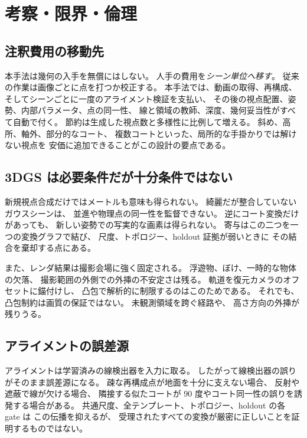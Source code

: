 \section{考察・限界・倫理}
\label{sec:discussion}

\subsection{注釈費用の移動先}
\label{sec:amortization}

本手法は幾何の入手を無償にはしない。
人手の費用を\emph{シーン単位へ移す}。
従来の作業は画像ごとに点を打つか校正する。
本手法では、動画の取得、再構成、
そしてシーンごとに一度のアライメント検証を支払い、
その後の視点配置、姿勢、内部パラメータ、点の同一性、
線と領域の教師、深度、幾何妥当性がすべて自動で付く。
節約は生成した視点数と多様性に比例して増える。
斜め、高所、軸外、部分的なコート、
複数コートといった、局所的な手掛かりでは解けない視点を
安価に追加できることがこの設計の要点である。

\subsection{3DGS は必要条件だが十分条件ではない}
\label{sec:gs_limit}

新規視点合成だけではメートルも意味も得られない。
綺麗だが整合していないガウスシーンは、
並進や物理点の同一性を監督できない。
逆にコート変換だけがあっても、
新しい姿勢での写実的な画素は得られない。
寄与はこの二つを一つの変換グラフで結び、
尺度、トポロジー、holdout 証拠が弱いときに
その結合を棄却する点にある。

また、レンダ結果は撮影会場に強く固定される。
浮遊物、ぼけ、一時的な物体の欠落、
撮影範囲の外側での外挿の不安定さは残る。
軌道を復元カメラのオフセットに錨付けし、
凸包で解析的に制限するのはこのためである。
それでも、凸包制約は画質の保証ではない。
未観測領域を跨ぐ経路や、
高さ方向の外挿が残りうる。

\subsection{アライメントの誤差源}
\label{sec:alignment_failure}

アライメントは学習済みの線検出器を入力に取る。
したがって線検出器の誤りがそのまま誤差源になる。
疎な再構成点が地面を十分に支えない場合、
反射や遮蔽で線が欠ける場合、
隣接する似たコートが 90 度やコート同一性の誤りを誘発する場合がある。
共通尺度、全テンプレート、トポロジー、holdout の各 gate は
この伝播を抑えるが、
受理されたすべての変換が厳密に正しいことを証明するものではない。

